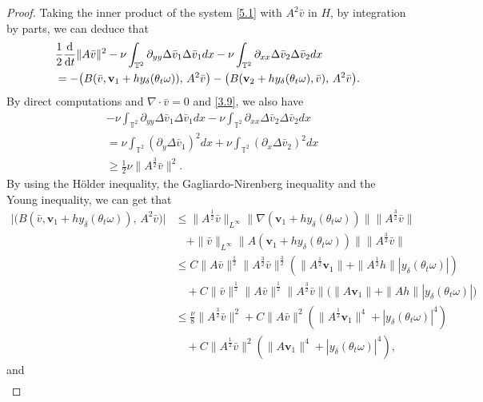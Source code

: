 \documentclass{elsarticle}
\theoremstyle{definition}
\numberwithin{equation}{section}
\renewcommand{\d}{{\rm{d}}}
\begin{document}
\begin{proof} Taking the inner product of the system   \eqref{5.1} with $A^2\bar{v}$ in $H$,  by integration by parts, we can deduce that
\begin{align}\label{5.5}
&\frac{1}{2}\frac{\d}{\d t}\|A\bar{v}\|^2-\nu \int_{\mathbb{T}^2}\partial_{yy}\Delta \bar{v}_1\Delta\bar{v}_1dx-\nu \int_{\mathbb{T}^2}\partial_{xx}\Delta \bar{v}_2\Delta \bar{v}_2dx\nonumber\\
&=- \big (B(\bar{v},\textbf{v}_1+hy_\delta(\theta_t\omega)),\, A^2\bar{v}  \big )
- \big (B(\textbf{v}_2+hy_\delta(\theta_t\omega),\bar{v}),\, A^2\bar{v} \big ).
\end{align}
By direct computations and $\nabla\cdot \bar{v}=0$ and \eqref{3.9}, we also have
\begin{align}
&-\nu \int_{\mathbb{T}^2}\partial_{yy}\Delta \bar{v}_1\Delta\bar{v}_1dx-\nu \int_{\mathbb{T}^2}\partial_{xx}\Delta \bar{v}_2\Delta \bar{v}_2dx\nonumber\\
&= \nu \int_{\mathbb{T}^2}(\partial_{y}\Delta \bar{v}_1)^2dx
+\nu \int_{\mathbb{T}^2}(\partial_{x}\Delta \bar{v}_2)^2dx
\nonumber\\
&\geq\frac12\nu\|A^{\frac32} \bar{v}\|^2.
\end{align}
By using the H\"{o}lder inequality, the Gagliardo-Nirenberg inequality and the Young inequality, we can get that
\begin{align}\label{5.6}
 \big| \big(B(\bar{v},\textbf{v}_1+hy_\delta(\theta_t\omega)),\, A^2\bar{v}\big)
 \big| &\leq \|A^\frac12\bar{v}\|_{L^\infty}\|\nabla(\textbf{v}_1+hy_\delta(\theta_t\omega))\|\|A^\frac32\bar{v}\|  \nonumber\\
&\quad
 +\|\bar{v}\|_{L^\infty}\|A(\textbf{v}_1+hy_\delta(\theta_t\omega))\|\|A^\frac32\bar{v}\|
 \nonumber\\
&\leq C\|A\bar{v}\|^\frac12\|A^\frac32\bar{v}\|^\frac32
\left (\|A^\frac12\textbf{v}_1\|+\|A^\frac12h\||y_\delta(\theta_t\omega)| \right )\nonumber\\
&\quad +C\|\bar{v}\|^\frac12\|A\bar{v}\|^\frac12\|A^\frac32\bar{v}\| \big(\|A\textbf{v}_1\|+\|Ah\||y_\delta(\theta_t\omega)| \big)\nonumber\\
&\leq \frac  \nu 8\|A^\frac32\bar{v}\|^2+C\|A\bar{v}\|^2 \left (\|A^\frac12\textbf{v}_1\|^4+|y_\delta(\theta_t\omega)|^4 \right)\nonumber\\
&\quad +C\|A^\frac12\bar{v}\|^2 \left (\|A\textbf{v}_1\|^4+|y_\delta(\theta_t\omega)|^4 \right),
\end{align}
and 
\begin{align}\label{5.7}

\end{align}
\end{proof}
\end{document}
